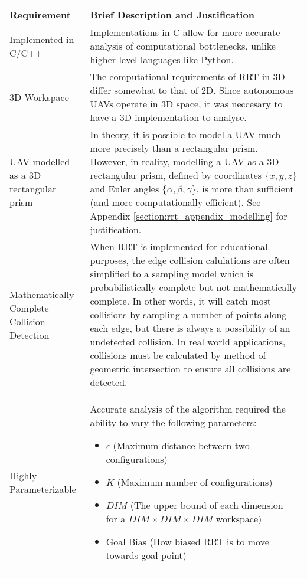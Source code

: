 \begin{table}[H]
\begin{center}
\begin{tabular}{|p{.2\linewidth}|p{.74\linewidth}|}
    \hline
    Requirement             & Brief Description and Justification \\
    \hline
    Implemented in C/C++    & 
        Implementations in C allow for more accurate analysis of computational bottlenecks, unlike higher-level languages like Python. \\
    \hline
    3D Workspace            & 
        The computational requirements of \gls{RRT} in \gls{3D} differ somewhat to that of \gls{2D}. Since autonomous \glspl{UAV} operate in 3D space, it was neccesary to have a \gls{3D} implementation to analyse. \\
    \hline
    \Gls{UAV} modelled as a \gls{3D} rectangular prism  & 
        In theory, it is possible to model a \gls{UAV} much more precisely than a rectangular prism. However, in reality, modelling a \gls{UAV} as a \gls{3D} rectangular prism, defined by coordinates $\{x, y, z\}$ and Euler angles $\{\alpha, \beta, \gamma \}$, is more than sufficient (and more computationally efficient). See Appendix \ref{section:rrt_appendix_modelling} for justification. \\
    \hline
    Mathematically Complete Collision Detection & 
        When \gls{RRT} is implemented for educational purposes, the edge collision calulations are often simplified to a sampling model which is \gls{probabilistically complete} but not \gls{mathematically complete}. In other words, it will catch most collisions by sampling a number of points along each edge, but there is always a possibility of an undetected collision. In real world applications, collisions must be calculated by method of geometric intersection to ensure all collisions are detected. \\
    \hline
    Highly Parameterizable      & 
        Accurate analysis of the algorithm required the ability to vary the following parameters: 
        \begin{itemize}
        \item $\epsilon$ (Maximum distance between two configurations)
        \item $K$ (Maximum number of configurations)
        \item $DIM$ (The upper bound of each dimension for a $DIM\times DIM\times DIM$ workspace)
        \item Goal Bias (How biased RRT is to move towards goal point)
        \end{itemize} \\
    \hline
\end{tabular}
\label{table:RRT_Tech_Specs_Abbrev}
\end{center}
\end{table}
